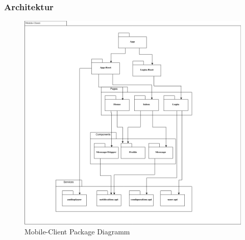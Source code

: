 \subsubsection{Architektur}
\begin{figure}[h]
    \label{fig:mobileClient-packages}
    \includegraphics[width=\linewidth]{graphics/MobileClient-Architecture-export}
    \caption[Mobile-Client Package Diagramm]{Mobile-Client Package Diagramm}
\end{figure}

\clearpage

